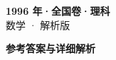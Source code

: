 \documentclass[zihao=-4, a4paper]{ctexart}
\begin{document}
\begin{center}
  {\Large\bfseries 1996 年·全国卷·理科}\\[4pt]
  {\large 数学 · 解析版}
\end{center}
\medskip
{}

\clearpage
{}
\begin{center}{\Large\bfseries 参考答案与详细解析}\end{center}
\medskip

\end{document}
